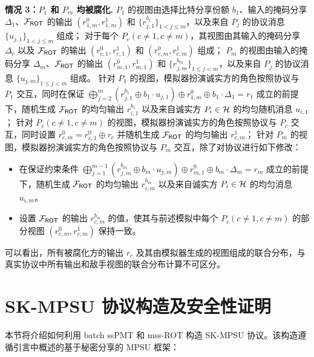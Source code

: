 \begin{trivlist}
\textbf{情况 3：$P_1$ 和 $P_m$ 均被腐化.}
$P_1$ 的视图由选择比特分享份额 $b_1$、输入的掩码分享 $\Delta_1$、$\mathcal{F}_\mathsf{ROT}$ 的输出 $(r_{1,m}^0, r_{1,m}^1)$ 和 $\{r_{j,1}^{b_1}\}_{1 < j \le m}$，以及来自 $P_j$ 的协议消息 $\{u_{j,1}\}_{1 < j \le m}$ 组成；
对于每个 $P_c (c \ne 1, c \ne m)$，其视图由其输入的掩码分享 $\Delta_c$ 以及 $\mathcal{F}_\mathsf{ROT}$ 的输出 $(r_{c,1}^0, r_{c,1}^1)$ 和 $(r_{c,m}^0, r_{c,m}^1)$ 组成；
$P_m$ 的视图由输入的掩码分享 $\Delta_m$、$\mathcal{F}_\mathsf{ROT}$ 的输出 $(r_{m,1}^0, r_{m,1}^1)$ 和 $\{r_{j,m}^{b_m}\}_{1 \le j < m}$，以及来自 $P_j$ 的协议消息 $\{u_{j,m}\}_{1 \le j < m}$ 组成。
针对 $P_1$ 的视图，模拟器扮演诚实方的角色按照协议与 $P_1$ 交互，同时在保证 $\bigoplus_{j=2}^{m}(r_{j,1}^{b_1} \oplus b_1 \cdot u_{j,1}) \oplus r_{1,m}^0 \oplus b_1 \cdot \Delta_1 = r_1$  成立的前提下，随机生成 $\mathcal{F}_\mathsf{ROT}$ 的均匀输出 $r_{i,1}^{b_1}$ 以及来自诚实方 $P_i \in \mathcal{H}$ 的均匀随机消息 $u_{i,1}$；
针对 $P_c (c \ne 1, c \ne m)$ 的视图，模拟器扮演诚实方的角色按照协议与 $P_c$ 交互，同时设置 $r_{c,m}^0 = r_{c,1}^0 \oplus r_c$ 并随机生成 $\mathcal{F}_\mathsf{ROT}$ 的均匀输出 $r_{c,m}^1$；
针对 $P_m$ 的视图，模拟器扮演诚实方的角色按照协议与 $P_m$ 交互，除了对协议进行如下修改：
\begin{itemize}
    \item 在保证约束条件 $\bigoplus_{j=1}^{m-1} (r_{j,m}^{b_m} \oplus b_m \cdot u_{j,m}) \oplus r_{m,1}^0 \oplus b_m \cdot \Delta_m = r_m$ 成立的前提下，随机生成 $\mathcal{F}_\mathsf{ROT}$ 的均匀输出 $r_{i,m}^{b_m}$ 以及来自诚实方 $P_i \in \mathcal{H}$ 的均匀消息 $u_{i,m}$。
    \item 设置 $\mathcal{F}_\mathsf{ROT}$ 的输出 $r_{c,m}^{b_m}$ 的值，使其与前述模拟中每个 $P_c (c \ne 1, c \ne m)$ 的部分视图 $(r_{c,m}^0, r_{c,m}^1)$ 保持一致。
\end{itemize}
可以看出，所有被腐化方的输出 $r_c$ 及其由模拟器生成的视图组成的联合分布，与真实协议中所有输出和敌手视图的联合分布计算不可区分。
\end{trivlist}

\section{SK-MPSU 协议构造及安全性证明}

本节将介绍如何利用 batch ssPMT 和 mss-ROT 构造 SK-MPSU 协议。该构造遵循引言中概述的基于秘密分享的 MPSU 框架：

